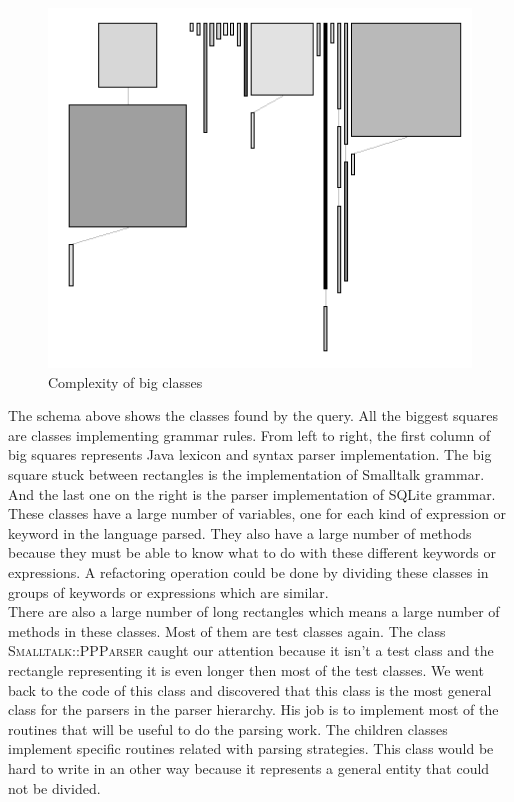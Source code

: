 \begin{figure}[ht]
\centering
\label{system_complexity_big_classes}
\includegraphics[scale=0.55]{system_complexity_big_methods.png}
\caption{Complexity of big classes}
\end{figure}
The schema above shows the classes found by the query. All the biggest squares are classes implementing grammar rules. From left to right, the first column of big squares represents Java lexicon and syntax parser implementation. The big square stuck between rectangles is the implementation of Smalltalk grammar. And the last one on the right is the parser implementation of SQLite grammar. These classes have a large number of variables, one for each kind of expression or keyword in the language parsed. They also have a large number of methods because they must be able to know what to do with these different keywords or expressions. A refactoring operation could be done by dividing these classes in groups of keywords or expressions which are similar.\\
There are also a large number of long rectangles which means a large number of methods in these classes. Most of them are test classes again. The class \textsc{Smalltalk::PPParser} caught our attention because it isn't a test class and the rectangle representing it is even longer then most of the test classes. We went back to the code of this class and discovered that this class is the most general class for the parsers in the parser hierarchy. His job is to implement most of the routines that will be useful to do the parsing work. The children classes implement specific routines related with parsing strategies. This class would be hard to write in an other way because it represents a general entity that could not be divided. 

